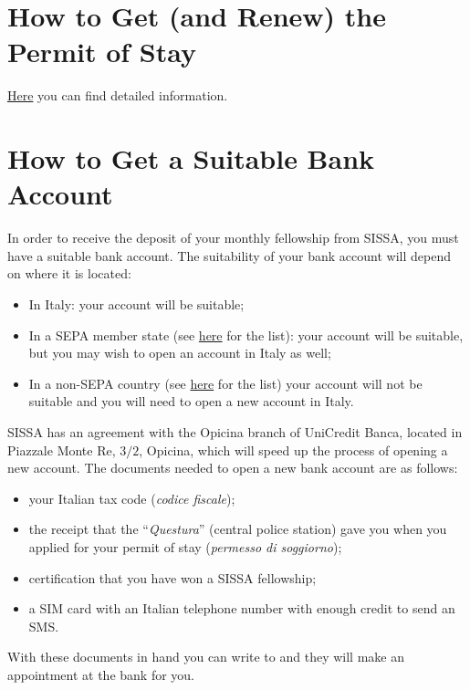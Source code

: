 \documentclass{sissavademecum}
\begin{document}
\section{How to Get (and Renew) the Permit of Stay}

\href{http://wiki.sissa.it/students/index.php/Permit_of_stay}{Here} you can find detailed information.


\section{How to Get a Suitable Bank Account}

In order to receive the deposit of your monthly fellowship from SISSA, you must have a suitable bank account. The suitability of your bank account will depend on where it is located:
\begin{itemize}
    \item In Italy: your account will be suitable;
    \item In a SEPA member state (see \href{http://www.sepaitalia.eu/welcome.asp?Page=2389&chardim=0&a=a&langid=1}{here} for the list): your account will be suitable, but you may wish to open an account in Italy as well;
    \item In a non-SEPA country (see \href{http://www.sepaitalia.eu/welcome.asp?Page=2389&chardim=0&a=a&langid=1}{here} for the list) your account will not be suitable and you will need to open a new account in Italy.
\end{itemize}

SISSA has an agreement with the Opicina branch of UniCredit Banca, located in Piazzale Monte Re, $3/2$, Opicina, which will speed up the process of opening a new account. The documents needed to open a new bank account are as follows:
\begin{itemize}
    \item your Italian tax code (\textit{codice fiscale});
    \item the receipt that the ``\textit{Questura}'' (central police station) gave you when you applied for your permit of stay (\textit{permesso di soggiorno});
    \item certification that you have won a SISSA fellowship;
    \item a SIM card with an Italian telephone number with enough credit to send an SMS.
\end{itemize}

With these documents in hand you can write to  and they will make an appointment at the bank for you.
\end{document}
